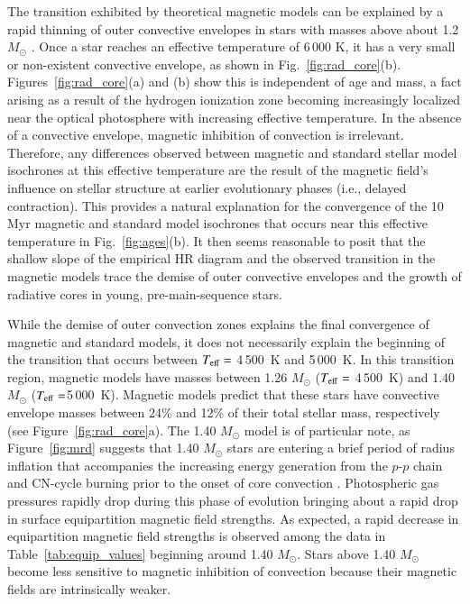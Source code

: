 \documentclass{aa}
\begin{document}
The transition exhibited by theoretical magnetic models can be explained by a rapid thinning of outer convective envelopes in stars with masses above about 1.2 $M_{\odot}$ \citep[e.g.,][]{Iben1965}. Once a star reaches an effective temperature of 6\,000 K, it has a very small or non-existent convective envelope, as shown in Fig.~\ref{fig:rad_core}(b). Figures~\ref{fig:rad_core}(a) and (b) show this is independent of age and mass, a fact arising as a result of the hydrogen ionization zone becoming increasingly localized near the optical photosphere with increasing effective temperature. In the absence of a convective envelope, magnetic inhibition of convection is irrelevant. Therefore, any differences observed between magnetic and standard stellar model isochrones at this effective temperature are the result of the magnetic field's influence on stellar structure at earlier evolutionary phases (i.e., delayed contraction). This provides a natural explanation for the convergence of the 10 Myr magnetic and standard model isochrones that occurs near this effective temperature in Fig.~\ref{fig:ages}(b). It then seems reasonable to posit that the shallow slope of the empirical HR diagram and the observed transition in the magnetic models trace the demise of outer convective envelopes and the growth of radiative cores in young, pre-main-sequence stars.

While the demise of outer convection zones explains the final convergence of magnetic and standard models, it does not necessarily explain the beginning of the transition that occurs between $T_{\rm eff} = $ 4\,500~K and 5\,000~K.  In this transition region, magnetic models have masses between 1.26 $M_{\odot}$ ($T_{\rm eff} = $ 4\,500~K) and 1.40 $M_{\odot}$ ($T_{\rm eff} = $5\,000~K). Magnetic models predict that these stars have convective envelope masses between 24\% and 12\% of their total stellar mass, respectively (see Figure~\ref{fig:rad_core}a). The 1.40 $M_{\odot}$ model is of particular note, as Figure~\ref{fig:mrd} suggests that 1.40 $M_{\odot}$ stars are entering a brief period of radius inflation that accompanies the increasing energy generation from the $p$-$p$ chain and CN-cycle burning prior to the onset of core convection \citep[e.g.,][]{Iben1965,Bodenheimer1965}. Photospheric gas pressures rapidly drop during this phase of evolution bringing about a rapid drop in surface equipartition magnetic field strengths. As expected, a rapid decrease in equipartition magnetic field strengths is observed among the data in Table~\ref{tab:equip_values} beginning around 1.40 $M_{\odot}$. Stars above 1.40 $M_{\odot}$ become less sensitive to magnetic inhibition of convection because their magnetic fields are intrinsically weaker.
\end{document}
